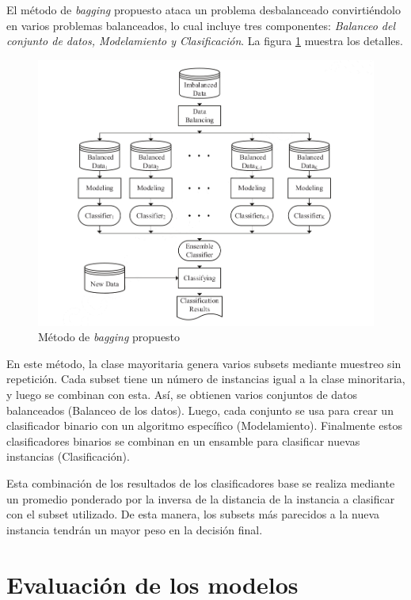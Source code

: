 El método de \textit{bagging} propuesto \citep{sun2015novel} ataca un problema desbalanceado convirtiéndolo en varios problemas balanceados, lo cual incluye tres componentes: \textit{Balanceo del conjunto de datos, Modelamiento y Clasificación}. La figura \ref{fig:bagging-imbalanced} muestra los detalles.

\begin{figure}
	\centering
	\includegraphics[width=\linewidth]{graficos/bagging_imbalanced.png}
	\caption{Método de \textit{bagging} propuesto \citep{sun2015novel}}
	\label{fig:bagging-imbalanced}
\end{figure}

En este método, la clase mayoritaria genera varios subsets mediante muestreo sin repetición. Cada subset tiene un número de instancias igual a la clase minoritaria, y luego se combinan con esta. Así, se obtienen varios conjuntos de datos balanceados (Balanceo de los datos). Luego, cada conjunto se usa para crear un clasificador binario con un algoritmo específico (Modelamiento). Finalmente estos clasificadores binarios se combinan en un ensamble para clasificar nuevas instancias (Clasificación).

Esta combinación de los resultados de los clasificadores base se realiza mediante un promedio ponderado por la inversa de la distancia de la instancia a clasificar con el subset utilizado. De esta manera, los subsets más parecidos a la nueva instancia tendrán un mayor peso en la decisión final.


\section{Evaluación de los modelos}

